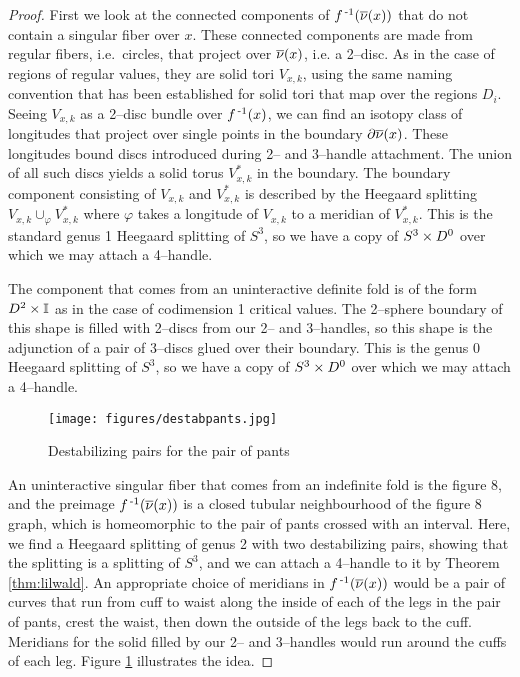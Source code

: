 \begin{proof}
	First we look at the connected components of $f^{\,\text{-}1}(\overline{\nu}(x))$ that do not contain a singular fiber over $x$.
	These connected components are made from regular fibers, i.e.\ circles, that project over $\overline{\nu}(x)$, i.e. a 2--disc.
	As in the case of regions of regular values, they are solid tori $V_{x,k}$, using the same naming convention that has been established for solid tori that map over the regions $D_i$.
	Seeing $V_{x,k}$ as a 2--disc bundle over $f^{\,\text{-}1}(x)$, we can find an isotopy class of longitudes that project over single points in the boundary $\partial\overline{\nu}(x)$.
	These longitudes bound discs introduced during 2-- and 3--handle attachment.
	The union of all such discs yields a solid torus $V_{x,k}^*$ in the boundary.
	The boundary component consisting of $V_{x,k}$ and $V_{x,k}^*$ is described by the Heegaard splitting $V_{x,k}\cup_\varphi V_{x,k}^*$ where $\varphi$ takes a longitude of $V_{x,k}$ to a meridian of $V_{x,k}^*$.
	This is the standard genus 1 Heegaard splitting of $S^3$, so we have a copy of $S^3\times D^0$ over which we may attach a 4--handle.

	The component that comes from an uninteractive definite fold is of the form $D^2\times\mathbb{I}$ as in the case of codimension 1 critical values.
	The 2--sphere boundary of this shape is filled with 2--discs from our 2-- and 3--handles, so this shape is the adjunction of a pair of 3--discs glued over their boundary.
	This is the genus 0 Heegaard splitting of $S^3$, so we have a copy of $S^3\times D^0$ over which we may attach a 4--handle.
		
	\begin{figure}
		\centering
		\caption{Destabilizing pairs for the pair of pants}
		\texttt{[image: figures/destabpants.jpg]}
		\label{fig:destabpants}
	\end{figure}
		
	An uninteractive singular fiber that comes from an indefinite fold is the figure 8, and the preimage $f^{\,\text{-}1}(\overline{\nu}(x))$ is a closed tubular neighbourhood of the figure 8 graph, which is homeomorphic to the pair of pants crossed with an interval.
	Here, we find a Heegaard splitting of genus 2 with two destabilizing pairs, showing that the splitting is a splitting of $S^3$, and we can attach a 4--handle to it by Theorem \ref{thm:lilwald}.
	An appropriate choice of meridians in $f^{\,\text{-}1}(\overline{\nu}(x))$ would be a pair of curves that run from cuff to waist along the inside of each of the legs in the pair of pants, crest the waist, then down the outside of the legs back to the cuff.
	Meridians for the solid filled by our 2-- and 3--handles would run around the cuffs of each leg.
	Figure \ref{fig:destabpants} illustrates the idea.
	

\end{proof}
